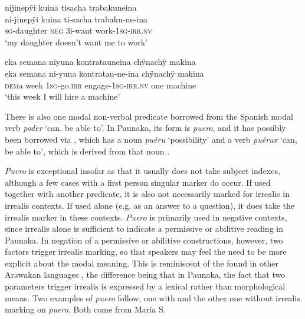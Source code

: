 \ea\label{ex:PTCP-complement}
\begingl 
\glpreamble nijinepÿi kuina tisacha trabakuneina\\
\gla ni-jinepÿi kuina ti-sacha trabaku-ne-ina\\ 
\textsc{sg}-daughter \textsc{neg} 3i-want work-1\textsc{sg}-\textsc{irr.nv}\\ 
\glft ‘my daughter doesn't want me to work’\\ 
\endgl
\trailingcitation{[jxx-n101013s-1.193-194]}
\xe

\ea\label{ex:PTCP-OBJ}
\begingl 
\glpreamble eka semana niyuna kontratauneina chÿnachÿ makina\\
\gla eka semana ni-yuna kontratau-ne-ina chÿnachÿ makina\\ 
\glb \textsc{dem}a week 1\textsc{sg}-go.\textsc{irr} engage-1\textsc{sg}-\textsc{irr.nv} one machine\\ 
\glft ‘this week I will hire a machine’\\ 
\endgl
\trailingcitation{[jxx-p120515l-2.106]}
\xe


There is also one modal non-verbal predicate borrowed from the Spanish modal verb \textit{poder} ‘can, be able to’. In Paunaka, its form is \textit{puero}, and it has possibly been borrowed via , which has a noun \textit{puéru} ‘possibility’ and a verb \textit{puérux} ‘can, be able to’, which is derived from that noun \citep[cf.][]{Sans2011}.

\textit{Puero} is exceptional insofar as that it usually does not take subject indexes, although a few cases with a first person singular marker do occur. If used together with another predicate, it is also not necessarily marked for irrealis in irrealis contexts. If used alone (e.g. as an answer to a question), it does take the irrealis marker in these contexts. \textit{Puero} is primarily used in negative contexts, since irrealis alone is sufficient to indicate a permissive or abilitive reading in Paunaka. In negation of a permissive or abilitive constructions, however, two factors trigger irrealis marking, so that speakers may feel the need to be more explicit about the modal meaning. This is reminiscent of the  found in other Arawakan languages \citep[cf.][271]{Michael2014}, the difference being that in Paunaka, the fact that two parameters trigger irrealis is expressed by a lexical rather than morphological means. Two examples of \textit{puero} follow, one with and the other one without irrealis marking on \textit{puero}. Both come from María S.

